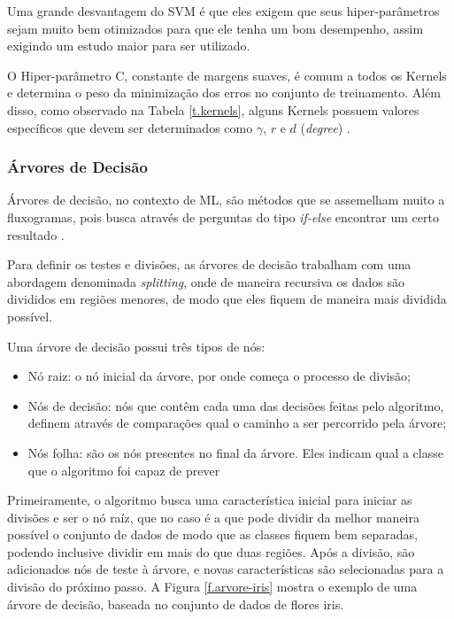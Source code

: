 Uma grande desvantagem do SVM é que eles exigem que seus hiper-parâmetros sejam muito bem otimizados para que ele tenha um bom desempenho, assim exigindo um estudo maior para ser utilizado. 

O Hiper-parâmetro C, constante de margens suaves, é comum a todos os Kernels e determina o peso da minimização dos erros no conjunto de treinamento. Além disso, como observado na Tabela \ref{t.kernels}, alguns Kernels possuem valores específicos que devem ser determinados como $\gamma$, $r$ e $d$ (\textit{degree}) \cite{lorena2007introduccao}.

\subsubsection{Árvores de Decisão}

Árvores de decisão, no contexto de ML, são métodos que se assemelham muito a fluxogramas, pois busca através de perguntas do tipo \textit{if-else} encontrar um certo resultado \cite{harrington2012machine}.

Para definir os testes e divisões, as árvores de decisão trabalham com uma abordagem denominada \textit{splitting}, onde de maneira recursiva os dados são divididos em regiões menores, de modo que eles fiquem de maneira mais dividida possível.

Uma árvore de decisão possui três tipos de nós:

\begin{itemize}
    \item Nó raiz: o nó inicial da árvore, por onde começa o processo de divisão;
    \item Nós de decisão: nós que contêm cada uma das decisões feitas pelo algoritmo, definem através de comparações qual o caminho a ser percorrido pela árvore;
    \item Nós folha: são os nós presentes no final da árvore. Eles indicam qual a classe que o algoritmo foi capaz de prever
\end{itemize}

Primeiramente, o algoritmo busca uma característica inicial para iniciar as divisões e ser o nó raíz, que no caso é a que pode dividir da melhor maneira possível o conjunto de dados de modo que as classes fiquem bem separadas, podendo inclusive dividir em mais do que duas regiões. Após a divisão, são adicionados nós de teste à árvore, e novas características são selecionadas para a divisão do próximo passo. A Figura \ref{f.arvore-iris} mostra o exemplo de uma árvore de decisão, baseada no conjunto de dados de flores iris.

